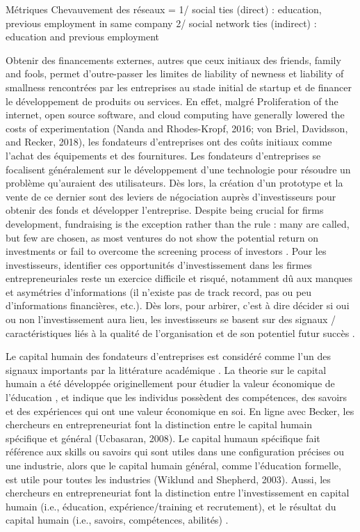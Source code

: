 \documentclass[12pt]{article}
\begin{document}
Métriques
Chevauvement des réseaux =
1/ social ties (direct) : education, previous employment in same company
2/ social network ties (indirect) : education and previous employment

Obtenir des financements externes, autres que ceux initiaux des friends, family and fools, permet d'outre-passer les limites de liability of newness et liability of smallness rencontrées par les entreprises au stade initial de startup et de financer le développement de produits ou services. En effet, malgré Proliferation of the internet, open source software, and cloud computing have generally lowered the costs of experimentation (Nanda and Rhodes-Kropf, 2016; von Briel, Davidsson, and Recker, 2018), les fondateurs d'entreprises ont des coûts initiaux comme l'achat des équipements et des fournitures. Les fondateurs d'entreprises se focalisent généralement sur le développement d'une technologie pour résoudre un problème qu'auraient des utilisateurs. Dès lors, la création d'un prototype et la vente de ce dernier sont des leviers de négociation auprès d'investisseurs pour obtenir des fonds et développer l'entreprise. Despite being crucial for firms development, fundraising is the exception rather than the rule : many are called, but few are chosen, as most ventures do not show the potential return on investments or fail to overcome the screening process of investors \citep{huang2017growing}. Pour les investisseurs, identifier ces opportunités d'investissement dans les firmes entrepreneuriales reste un exercice difficile et risqué, notamment dû aux manques et asymétries d'informations (il n'existe pas de track record, pas ou peu d'informations financières, etc.). Dès lors, pour arbirer, c'est à dire décider si oui ou non l'investissement aura lieu, les investisseurs se basent sur des signaux / caractéristiques liés à la qualité de l'organisation et de son potentiel futur succès \citep{plummer2016better}.

Le capital humain des fondateurs d'entreprises est considéré comme l'un des signaux importants par la littérature académique \citet{pinelli2020too, ko2018signaling}. La theorie sur le capital humain a été développée originellement pour étudier la valeur économique de l'éducation \citep{becker1964human}, et indique que les individus possèdent des compétences, des savoirs et des expériences qui ont une valeur économique en soi. En ligne avec Becker, les chercheurs en entrepreneuriat font la distinction entre le capital humain spécifique et général (Ucbasaran, 2008). Le capital humaun spécifique fait référence aux skills ou savoirs qui sont utiles dans une configuration précises ou une industrie, alors que le capital humain général, comme l'éducation formelle, est utile pour toutes les industries (Wiklund and Shepherd, 2003). Aussi, les chercheurs en entrepreneuriat font la distinction entre l'investissement en capital humain (i.e., éducation, expérience/training et recrutement), et le résultat du capital humain (i.e., savoirs, compétences, abilités) \citep{marvel2016human}.
\end{document}
